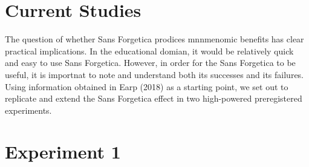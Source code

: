 \documentclass[pdf]{apa6}
\begin{document}
\hypertarget{current-studies}{%
\section{Current Studies}\label{current-studies}}

The question of whether Sans Forgetica prodices mnnmenomic benefits has clear practical implications. In the educational domian, it would be relatively quick and easy to use Sans Forgetica. However, in order for the Sans Forgetica to be useful, it is importnat to note and understand both its successes and its failures. Using information obtained in Earp (2018) as a starting point, we set out to replicate and extend the Sans Forgetica effect in two high-powered preregistered experiments.

\hypertarget{experiment-1}{%
\section{Experiment 1}\label{experiment-1}}
\end{document}
